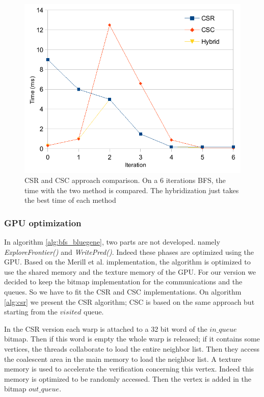 \begin{figure}[!t]
	\centering
	\includegraphics[width=.8\columnwidth]{figures/graph500/csr_csc_hybrid_iteration}
	\caption{CSR and CSC approach comparison. On a 6 iterations BFS, the time with the two method is compared. The hybridization just takes the best time of each method}
	\label{fig:csr_csc}
\end{figure}

\subsubsection{GPU optimization}

In algorithm \ref{alg:bfs_bluegene}, two parts are not developed. namely \textit{ExploreFrontier()} and \textit{WritePred()}. Indeed these phases are optimized using the GPU. 
Based on the Merill et al. implementation, the algorithm is optimized to use the shared memory and the texture memory of the GPU. 
For our version we decided to keep the bitmap implementation for the communications and the queues. So we have to fit the CSR and CSC implementations. 
On algorithm \ref{alg:csr} we present the CSR algorithm;
CSC is based on the same approach but starting from the $visited$ queue. 

In the CSR version each warp is attached to a 32 bit word of the $in\_queue$ bitmap. 
Then if this word is empty the whole warp is released; 
if it contains some vertices, the threads collaborate to load the entire neighbor list. 
Then they access the coalescent area in the main memory to load the neighbor list. 
A texture memory is used to accelerate the verification concerning this vertex. Indeed this memory is optimized to be randomly accessed. 
Then the vertex is added in the bitmap $out\_queue$.

